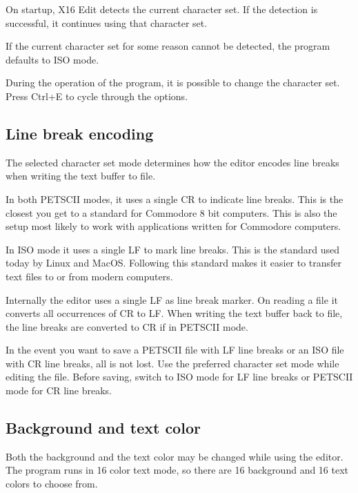 \documentclass{article}
\begin{document}
        \noindent On startup, X16 Edit detects the current character set. If the detection is successful, it
        continues using that character set.

        If the current character set for some reason cannot be detected, the program defaults to ISO mode.

        During the operation of the program, it is possible to change the character set. Press Ctrl+E to cycle
        through the options.

    \subsection{Line break encoding}

        The selected character set mode determines how the editor encodes line breaks when writing the
        text buffer to file. 
        
        In both PETSCII modes, it uses a single CR to indicate line breaks. This
        is the closest you get to a standard for Commodore 8 bit computers. This is also the
        setup most likely to work with applications written for Commodore computers.
        
        In ISO mode it uses
        a single LF to mark line breaks. This is the standard used today by Linux and MacOS. Following
        this standard makes it easier to transfer text files to or from modern computers.

        Internally the editor uses a single LF as line break marker. On reading a file it converts
        all occurrences of CR to LF. When writing the text buffer back to file, the line breaks
        are converted to CR if in PETSCII mode.

        In the event you want to save a PETSCII file with LF line breaks or an ISO file with
        CR line breaks, all is not lost. Use the preferred character set mode while
        editing the file. Before saving, switch to ISO mode for LF line breaks or PETSCII mode
        for CR line breaks.

    \subsection{Background and text color}

        Both the background and the text color may be changed while using the editor. The program
        runs in 16 color text mode, so there are 16 background and 16 text colors to choose from.
\end{document}
